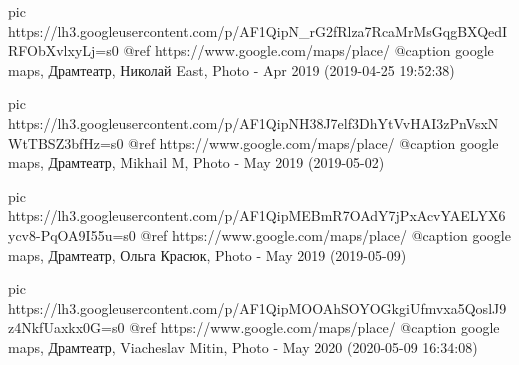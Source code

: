      pic https://lh3.googleusercontent.com/p/AF1QipN_rG2fRlza7RcaMrMsGqgBXQedIRFObXvlxyLj=s0
     @ref https://www.google.com/maps/place/%
     @caption google maps, Драмтеатр, Николай East, Photo - Apr 2019 (2019-04-25 19:52:38)

     pic https://lh3.googleusercontent.com/p/AF1QipNH38J7elf3DhYtVvHAI3zPnVsxNWtTBSZ3bfHz=s0
     @ref https://www.google.com/maps/place/%
     @caption google maps, Драмтеатр, Mikhail M, Photo - May 2019 (2019-05-02)

     pic https://lh3.googleusercontent.com/p/AF1QipMEBmR7OAdY7jPxAcvYAELYX6ycv8-PqOA9I55u=s0
     @ref https://www.google.com/maps/place/%
     @caption google maps, Драмтеатр, Ольга Красюк, Photo - May 2019 (2019-05-09)

     pic https://lh3.googleusercontent.com/p/AF1QipMOOAhSOYOGkgiUfmvxa5QoslJ9z4NkfUaxkx0G=s0
     @ref https://www.google.com/maps/place/%
     @caption google maps, Драмтеатр, Viacheslav Mitin, Photo - May 2020 (2020-05-09 16:34:08)

